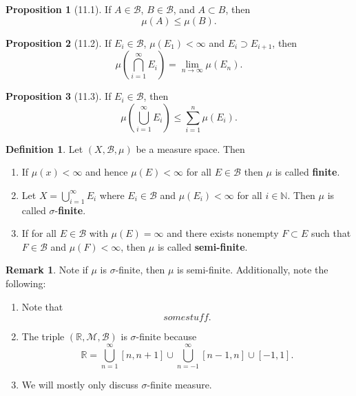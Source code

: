 \documentclass[12pt]{article}
\newcommand{\R}{\mathbb{R}}
\newcommand{\N}{\mathbb{N}}
\newcommand{\B}{\mathcal{B}}
\theoremstyle{definition}
\newtheorem*{definition}{Definition}
\newtheorem*{prop}{Proposition}
\newtheorem*{remark}{Remark}
\begin{document}
\begin{prop}[11.1]

  If \( A \in \B \), \( B \in \B \), and \( A \subset B \), then 
    \[
        \mu(A) \leq \mu(B).
    \]

  

\end{prop}

\begin{prop}[11.2]

  If \( E_i \in \B \), \( \mu(E_1) < \infty \) and \( E_i \supset E_{i+1} \), then 
    \[
        \mu \left( \bigcap_{i=1}^{\infty} E_i \right) = \lim_{n \to \infty} \mu \left( E_n \right).
    \]


\end{prop}


\begin{prop}[11.3]

  If \( E_i \in \B \), then
    \[
        \mu \left( \bigcup_{i=1}^{\infty} E_i \right) \leq \sum_{i=1}^{n} \mu \left( E_i \right).
    \]


\end{prop}

\begin{definition}

  Let \( (X, \B, \mu ) \) be a measure space. Then  
    \begin{enumerate}[label = (\arabic{*})]
      \item If \( \mu(x) < \infty \) and hence \( \mu(E) < \infty \) for all \( E \in \B \) then \( \mu \) is called \textbf{finite}.
      
      \item Let \( \displaystyle X = \bigcup_{i=1}^{\infty} E_i \) where \( E_i \in \B \) and \( \mu(E_i) < \infty \) for all \( i \in \N \).
      Then \( \mu \) is called \( \sigma \)-\textbf{finite}.
       
      \item  If for all \( E \in \B \) with \( \mu(E) = \infty \) and  there exists nonempty \( F \subset E \) such that \( F \in \B \) and \( \mu(F) < \infty \), then \( \mu \) is called \textbf{semi-finite}.
    \end{enumerate}

\end{definition}

\begin{remark}

  Note if \( \mu \) is \( \sigma \)-finite, then \( \mu \) is semi-finite.  Additionally, note the following:
    \begin{enumerate}[label = (\arabic{*})]
      \item Note that
        \[
            some stuff.
        \]
      \item The triple \( (\R, \mathcal{M}, \B) \) is \( \sigma \)-finite because 
        \[
            \R = \bigcup_{n=1}^{\infty} [n, n+1] \cup \bigcup_{n=-1}^{\infty}[n-1, n] \cup [-1,1].
        \]
        \item We will mostly only discuss \( \sigma \)-finite measure.
    \end{enumerate}
  
\end{remark}
\end{document}
